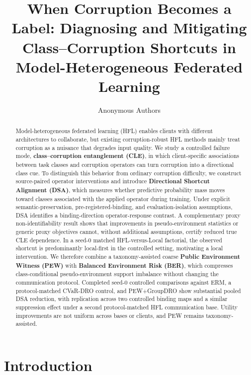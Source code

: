 \documentclass[10pt,twocolumn]{article}
\title{When Corruption Becomes a Label: Diagnosing and Mitigating\\
Class--Corruption Shortcuts in Model-Heterogeneous Federated Learning}
\author{Anonymous Authors}
\date{}
\begin{document}
\maketitle

\begin{abstract}

Model-heterogeneous federated learning (HFL) enables clients with different architectures to collaborate, but existing corruption-robust HFL methods mainly treat corruption as a nuisance that degrades input quality. We study a controlled failure mode, \textbf{class--corruption entanglement (CLE)}, in which client-specific associations between task classes and corruption operators can turn corruption into a directional class cue. To distinguish this behavior from ordinary corruption difficulty, we construct source-paired operator interventions and introduce \textbf{Directional Shortcut Alignment (DSA)}, which measures whether predictive probability mass moves toward classes associated with the applied operator during training. Under explicit semantic-preservation, pre-registered-binding, and evaluation-isolation assumptions, DSA identifies a binding-direction operator-response contrast. A complementary proxy non-identifiability result shows that improvements in pseudo-environment statistics or generic proxy objectives cannot, without additional assumptions, certify reduced true CLE dependence. In a seed-0 matched HFL-versus-Local factorial, the observed shortcut is predominantly local-first in the controlled setting, motivating a local intervention. We therefore combine a taxonomy-assisted coarse \textbf{Public Environment Witness (PEW)} with \textbf{Balanced Environment Risk (BER)}, which compresses class-conditional pseudo-environment support imbalance without changing the communication protocol. Completed seed-0 controlled comparisons against ERM, a protocol-matched CVaR-DRO control, and PEW+GroupDRO show substantial pooled DSA reduction, with replication across two controlled binding maps and a similar suppression effect under a second protocol-matched HFL communication base. Utility improvements are not uniform across bases or clients, and PEW remains taxonomy-assisted.

\end{abstract}

\section{Introduction}
\end{document}
